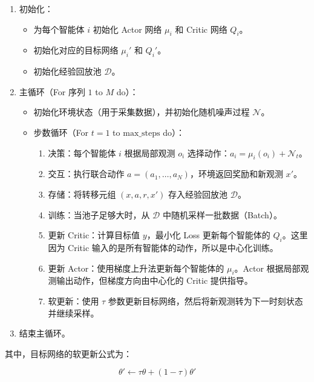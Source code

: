 \begin{enumerate}
\def\labelenumi{\arabic{enumi}.}
\tightlist
\item
  初始化：

  \begin{itemize}
  \tightlist
  \item
    为每个智能体 \(i\) 初始化 Actor 网络 \(\mu_i\) 和 Critic 网络 \(Q_i\)。
  \item
    初始化对应的目标网络 \(\mu_i'\) 和 \(Q_i'\)。
  \item
    初始化经验回放池 \(\mathcal{D}\)。
  \end{itemize}
\item
  主循环（For 序列 \(1\) to \(M\) do）：

  \begin{itemize}
  \tightlist
  \item
    初始化环境状态（用于采集数据），并初始化随机噪声过程 \(\mathcal{N}\)。
  \item
    步数循环（For \(t=1\) to \(\mathrm{max\_steps}\) do）：

    \begin{enumerate}
    \def\labelenumii{\arabic{enumii}.}
    \tightlist
    \item
      决策：每个智能体 \(i\) 根据局部观测 \(o_i\) 选择动作：\(a_i=\mu_i(o_i)+\mathcal{N}_t\)。
    \item
      交互：执行联合动作 \(a=(a_1,\ldots,a_N)\)，环境返回奖励和新观测 \(x'\)。
    \item
      存储：将转移元组 \((x,a,r,x')\) 存入经验回放池 \(\mathcal{D}\)。
    \item
      训练：当池子足够大时，从 \(\mathcal{D}\) 中随机采样一批数据（Batch）。
    \item
      更新 Critic：计算目标值 \(y\)，最小化 Loss 更新每个智能体的 \(Q_i\)。这里因为 Critic 输入的是所有智能体的动作，所以是中心化训练。
    \item
      更新 Actor：使用梯度上升法更新每个智能体的 \(\mu_i\)。Actor 根据局部观测输出动作，但梯度方向由中心化的 Critic 提供指导。
    \item
      软更新：使用 \(\tau\) 参数更新目标网络，然后将新观测转为下一时刻状态并继续采样。
    \end{enumerate}
  \end{itemize}
\item
  结束主循环。
\end{enumerate}

其中，目标网络的软更新公式为：

\[
\theta'
\leftarrow
\tau\theta+(1-\tau)\theta'
\]

